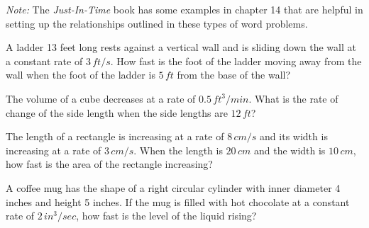 \documentclass[mathNotesPreamble]{subfiles}
\begin{document}
\pagebreak
\begin{center}
\end{center}

\textit{Note:} The \textit{Just-In-Time} book has some examples in chapter 14 that are helpful in setting up the relationships outlined in these types of word problems.
\pagebreak

\begin{ex*}
  A ladder 13 feet long rests against a vertical wall and is sliding down the wall at a constant rate of $3\,ft/s$. How fast is the foot of the ladder moving away from the wall when the foot of the ladder is $5\,ft$ from the base of the wall?
\end{ex*}
\pagebreak

\begin{ex*}
  The volume of a cube decreases at a rate of $0.5\,ft^3/min$. What is the rate of change of the side length when the side lengths are $12\,ft$?
\end{ex*}
\pagebreak

\begin{ex*}
  The length of a rectangle is increasing at a rate of $8\,cm/s$ and its width is increasing at a rate of $3\,cm/s$. When the length is $20\,cm$ and the width is $10\,cm$, how fast is the area of the rectangle increasing?
\end{ex*}
\pagebreak

\begin{ex*}
  A coffee mug has the shape of a right circular cylinder with inner diameter 4 inches and height 5 inches. If the mug is filled with hot chocolate at a constant rate of $2\,in^3/sec$, how fast is the level of the liquid rising?
\end{ex*}
\pagebreak
\end{document}
